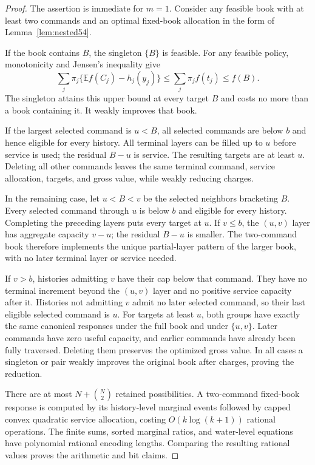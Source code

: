 \documentclass[11pt,letterpaper]{article}
\theoremstyle{definition}\newtheorem{remark}[theorem]{Remark}
\begin{document}
\begin{proof}
The assertion is immediate for $m=1$. Consider any feasible book with at least two commands and an optimal fixed-book allocation in the form of Lemma~\ref{lem:nested54}.

If the book contains $B$, the singleton $\{B\}$ is feasible. For any feasible policy, monotonicity and Jensen's inequality give
\[
 \sum_j\pi_j\{\mathbb E f(C_j)-h_j(y_j)\}
 \leq\sum_j\pi_jf(t_j)\leq f(B).
\]
The singleton attains this upper bound at every target $B$ and costs no more than a book containing it. It weakly improves that book.

If the largest selected command is $u<B$, all selected commands are below $b$ and hence eligible for every history. All terminal layers can be filled up to $u$ before service is used; the residual $B-u$ is service. The resulting targets are at least $u$. Deleting all other commands leaves the same terminal command, service allocation, targets, and gross value, while weakly reducing charges.

In the remaining case, let $u<B<v$ be the selected neighbors bracketing $B$. Every selected command through $u$ is below $b$ and eligible for every history. Completing the preceding layers puts every target at $u$. If $v\leq b$, the $(u,v)$ layer has aggregate capacity $v-u$; the residual $B-u$ is smaller. The two-command book therefore implements the unique partial-layer pattern of the larger book, with no later terminal layer or service needed.

If $v>b$, histories admitting $v$ have their cap below that command. They have no terminal increment beyond the $(u,v)$ layer and no positive service capacity after it. Histories not admitting $v$ admit no later selected command, so their last eligible selected command is $u$. For targets at least $u$, both groups have exactly the same canonical responses under the full book and under $\{u,v\}$. Later commands have zero useful capacity, and earlier commands have already been fully traversed. Deleting them preserves the optimized gross value. In all cases a singleton or pair weakly improves the original book after charges, proving the reduction.

There are at most $N+\binom N2$ retained possibilities. A two-command fixed-book response is computed by its history-level marginal events followed by capped convex quadratic service allocation, costing $O(k\log(k+1))$ rational operations. The finite sums, sorted marginal ratios, and water-level equations have polynomial rational encoding lengths. Comparing the resulting rational values proves the arithmetic and bit claims.
\end{proof}
\end{document}
